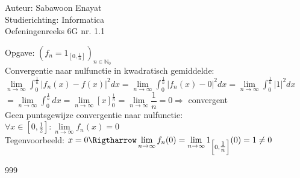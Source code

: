 \documentclass[a4paper]{article}
\begin{document}
  
\noindent \large Auteur: Sabawoon Enayat \\
\noindent \large Studierichting: Informatica\\
\noindent \large Oefeningenreeks 6G nr. 1.1 \\

\medskip

\newcommand{\llim}{\lim\limits}
\newcommand{\dint}{\displaystyle\int}

\normalsize

Opgave: $\left(f_n = 1_{\left[0, \tfrac{1}{n}\right]}\right)_{n\in\mathbb{N}_0}$\\

Convergentie naar nulfunctie in kwadratisch gemiddelde:\\

$\llim_{n\to\infty} \dint_{0}^{\tfrac{1}{n}} |f_n(x) - f(x)|^2 dx = \llim_{n\to\infty} \dint_{0}^{\tfrac{1}{n}} |f_n(x) - 0|^2 dx = \llim_{n\to\infty} \dint_{0}^{\tfrac{1}{n}} |1|^2 dx$\\

$= \llim_{n\to\infty} \dint_{0}^{\tfrac{1}{n}} dx = \llim_{n\to\infty} [x]_{0}^{\tfrac{1}{n}} = \llim_{n\to\infty} \dfrac{1}{n} = 0 \Rightarrow$ convergent\\

Geen puntsgewijze convergentie naar nulfunctie:\\

$\forall x\in[0, \tfrac{1}{2}]: \llim_{n\to\infty} f_n(x) = 0$\\

Tegenvoorbeeld: $x = 0 \Rigtharrow \llim_{n\to\infty} f_n(0) = \llim_{n\to\infty} 1_{\left[0, \tfrac{1}{n}\right]}(0) = 1\ne 0$

\begin{thebibliography}{999}
\end{thebibliography}
\end{document}
